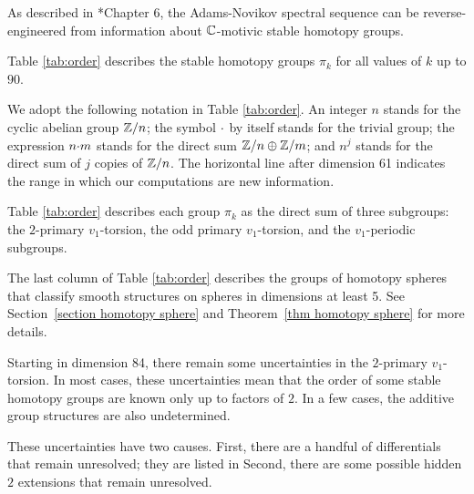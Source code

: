  As described in
\cite{Isaksen14c}*{Chapter 6}, the Adams-Novikov spectral sequence
can be reverse-engineered from information about $\mathbb{C}$-motivic
stable homotopy groups.

\begin{cor}
\label{cor:cl-order}
Table \ref{tab:order} describes the stable homotopy groups $\pi_k$
for all values of $k$ up to $90$.
\end{cor}

We adopt the following
notation in Table \ref{tab:order}.  
An integer $n$ stands for the cyclic abelian group $\mathbb{Z}/n$; 
the symbol $\mathord{\cdot}$ by itself stands for the trivial group;
the expression $n\mathord{\cdot} m$ stands for the direct sum $\mathbb{Z}/n \oplus \mathbb{Z}/m$;
and $n^j$ stands for the direct sum of $j$ copies of $\mathbb{Z}/n$.
The horizontal line after dimension 61 indicates the range
in which our computations are new information.

Table \ref{tab:order} describes each group $\pi_k$ as the direct sum
of three subgroups: the $2$-primary $v_1$-torsion, the
odd primary $v_1$-torsion, and the $v_1$-periodic subgroups.

The last column of Table \ref{tab:order} describes the groups of homotopy spheres  that classify smooth structures on spheres in dimensions at least 5. See Section~\ref{section homotopy sphere} and Theorem~\ref{thm homotopy sphere} for more details.

Starting in dimension 84, there remain some uncertainties in the $2$-primary $v_1$-torsion.
In most cases, these uncertainties mean that the order of some stable
homotopy groups are
known only up to factors of $2$.  In a few cases, the additive group
structures are also undetermined.

These uncertainties have two causes.  First, there are a handful
of differentials that remain unresolved; they are listed in
Second, there are some possible hidden $2$ extensions
that remain unresolved.

